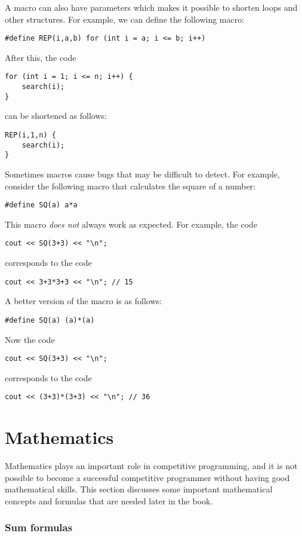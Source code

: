 A macro can also have parameters
which makes it possible to shorten loops and other
structures.
For example, we can define the following macro:
\begin{lstlisting}
#define REP(i,a,b) for (int i = a; i <= b; i++)
\end{lstlisting}
After this, the code
\begin{lstlisting}
for (int i = 1; i <= n; i++) {
    search(i);
}
\end{lstlisting}
can be shortened as follows:
\begin{lstlisting}
REP(i,1,n) {
    search(i);
}
\end{lstlisting}

Sometimes macros cause bugs that may be difficult
to detect. For example, consider the following macro
that calculates the square of a number:
\begin{lstlisting}
#define SQ(a) a*a
\end{lstlisting}
This macro \emph{does not} always work as expected.
For example, the code
\begin{lstlisting}
cout << SQ(3+3) << "\n";
\end{lstlisting}
corresponds to the code
\begin{lstlisting}
cout << 3+3*3+3 << "\n"; // 15
\end{lstlisting}

A better version of the macro is as follows:
\begin{lstlisting}
#define SQ(a) (a)*(a)
\end{lstlisting}
Now the code
\begin{lstlisting}
cout << SQ(3+3) << "\n";
\end{lstlisting}
corresponds to the code
\begin{lstlisting}
cout << (3+3)*(3+3) << "\n"; // 36
\end{lstlisting}


\section{Mathematics}

Mathematics plays an important role in competitive
programming, and it is not possible to become
a successful competitive programmer without
having good mathematical skills.
This section discusses some important
mathematical concepts and formulas that
are needed later in the book.

\subsubsection{Sum formulas}

